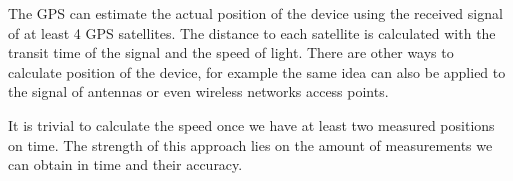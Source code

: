 The GPS can estimate the actual position of the device using the received signal
of at least 4 GPS satellites. The distance to each satellite is calculated with
the transit time of the signal and the speed of light. There are other ways to 
calculate position of the device, for example the same idea can also be applied 
to the signal of antennas or even wireless networks access points.

It is trivial to calculate the speed once we have at least two measured
positions on time. The strength of this approach lies on the amount of
measurements we can obtain in time and their accuracy.

